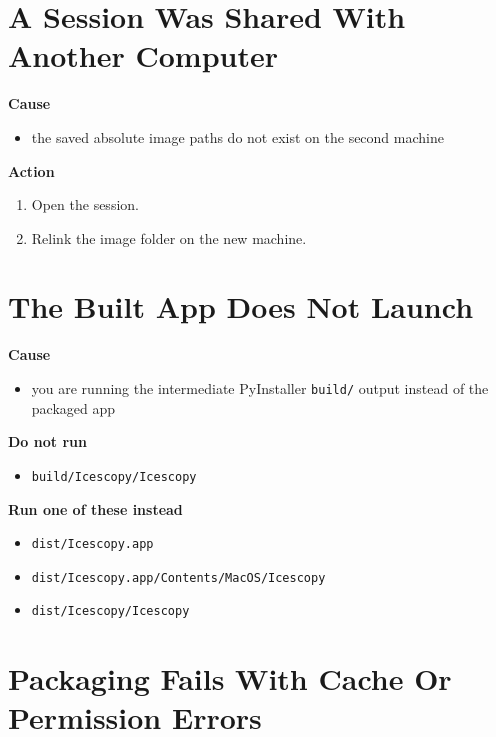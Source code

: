 \documentclass[
  9pt,
  letterpaper,
  oneside,
  open=any,
  DIV=15,
  parskip=half-,
  headings=big,
  numbers=noenddot
]{scrbook}
\newcommand{\manuallead}[1]{%
  \vspace{0.15em}%
  {\sffamily\bfseries\color{ManualBlue}#1}\par\nobreak\vspace{0.05em}%
}
\begin{document}
\section{A Session Was Shared With Another Computer}

\manuallead{Cause}

\begin{itemize}[leftmargin=*,itemsep=0.35em,topsep=0.4em]
\item the saved absolute image paths do not exist on the second machine
\end{itemize}

\manuallead{Action}

\begin{enumerate}[leftmargin=*,itemsep=0.35em,topsep=0.4em]
\item Open the session.
\item Relink the image folder on the new machine.
\end{enumerate}

\section{The Built App Does Not Launch}

\manuallead{Cause}

\begin{itemize}[leftmargin=*,itemsep=0.35em,topsep=0.4em]
\item you are running the intermediate PyInstaller \texttt{build/} output instead of the packaged app
\end{itemize}

\manuallead{Do not run}

\begin{itemize}[leftmargin=*,itemsep=0.35em,topsep=0.4em]
\item \texttt{build/Icescopy/Icescopy}
\end{itemize}

\manuallead{Run one of these instead}

\begin{itemize}[leftmargin=*,itemsep=0.35em,topsep=0.4em]
\item \texttt{dist/Icescopy.app}
\item \texttt{dist/Icescopy.app/Contents/MacOS/Icescopy}
\item \texttt{dist/Icescopy/Icescopy}
\end{itemize}

\section{Packaging Fails With Cache Or Permission Errors}
\end{document}
